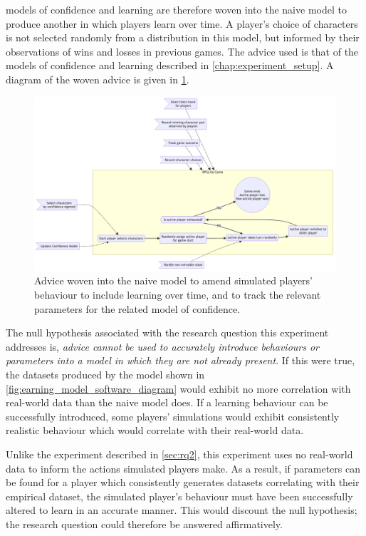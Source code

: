 \Aspectoriented{} models of confidence and learning are therefore woven into the naive model to
produce another in which players learn over time. A player's choice of
characters is not selected randomly from a distribution in this model, but
informed by their observations of wins and losses in previous games. The advice
used is that of the models of confidence and learning described in
\cref{chap:experiment_setup}. A diagram of the woven advice is given in
\cref{fig:learning_model_software_diagram}.

\begin{figure}[h]
  \centering
  \includegraphics[width=\columnwidth]{70_generality_of_aspects/diagrams/exp3_learning_model.png}
  \caption{Advice woven into the naive model to amend simulated players' behaviour to include learning over time, and to track the relevant parameters for the related model of confidence.}
  \label{fig:learning_model_software_diagram}
\end{figure}

The null hypothesis associated with the research question this experiment
addresses is, \emph{advice cannot be used to accurately introduce behaviours or
parameters into a model in which they are not already present}. If this were
true, the datasets produced by the \aspectoriented model shown in
\cref{fig:earning_model_software_diagram} would exhibit no more correlation with
real-world data than the naive model does. If a learning behaviour can be
successfully introduced, some players' simulations would exhibit consistently
realistic behaviour which would correlate with their real-world data.

Unlike the experiment described in \cref{sec:rq2}, this experiment uses no
real-world data to inform the actions simulated players make. As a result, if
parameters can be found for a player which consistently generates datasets
correlating with their empirical dataset, the simulated player's behaviour must
have been successfully altered to learn in an accurate manner. This would
discount the null hypothesis; the research question could therefore be answered
affirmatively.





